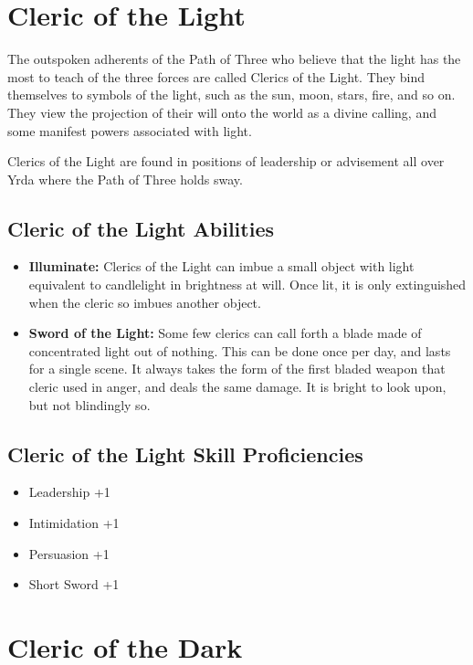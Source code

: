 \begin{multicols}{2}
\section{Cleric of the Light}

The outspoken adherents of the Path of Three who believe that the
light has the most to teach of the three forces are called Clerics
of the Light. They bind themselves to symbols of the light, such as
the sun, moon, stars, fire, and so on. They view the projection of
their will onto the world as a divine calling, and some manifest
powers associated with light.

Clerics of the Light are found in positions of leadership or advisement
all over Yrda where the Path of Three holds sway.

\subsection{Cleric of the Light Abilities}

\begin{itemize}
    \item \textbf{Illuminate:} Clerics of the Light can imbue a small object
    with light equivalent to candlelight in brightness at will. Once lit,
    it is only extinguished when the cleric so imbues another object.
    \item \textbf{Sword of the Light:} Some few clerics can call forth a
    blade made of concentrated light out of nothing. This can be done once
    per day, and lasts for a single scene. It always takes the form of the
    first bladed weapon that cleric used in anger, and deals the same damage.
    It is bright to look upon, but not blindingly so.
\end{itemize}

\subsection{Cleric of the Light Skill Proficiencies}

\begin{itemize}
    \item Leadership +1
    \item Intimidation +1
    \item Persuasion +1
    \item Short Sword +1
\end{itemize}

\section{Cleric of the Dark}


\end{multicols}
